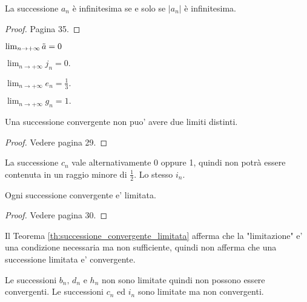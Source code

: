 \begin{proposition}
    La successione $a_n$ è infinitesima se e solo se $|a_n|$ è infinitesima.
\end{proposition}
\begin{proof}
    Pagina 35.
\end{proof}

\begin{example}       $\lim_{n\rightarrow+\infty}\Tilde{a} = 0$
\end{example}

\begin{example}
    $\lim_{n\rightarrow+\infty}j_n = 0.$
\end{example}

\begin{example}
    $\lim_{n\rightarrow+\infty}e_n = \frac{1}{3}.$
\end{example}

\begin{example}
    $\lim_{n\rightarrow+\infty}g_n = 1.$
\end{example}

\begin{theorem}
    Una successione convergente non puo' avere due limiti distinti.
\end{theorem}
\begin{proof}
    Vedere pagina 29.
\end{proof}

\begin{example}
    La successione $c_n$ vale alternativamente 0 oppure 1, quindi non potrà essere contenuta in un raggio minore di $\frac{1}{2}$. Lo stesso $i_n$.
\end{example}

\begin{theorem}\label{th:successione_convergente_limitata}
    Ogni successione convergente e' limitata.
\end{theorem}
\begin{proof}
    Vedere pagina 30.
\end{proof}

\begin{remark}
    Il Teorema \ref{th:successione_convergente_limitata} afferma che la "limitazione" e' una condizione necessaria ma non sufficiente, quindi non afferma che una successione limitata e' convergente.
\end{remark}

\begin{example}
    Le successioni $b_n,\, d_n$ e $h_n$ non sono limitate quindi non possono essere convergenti. Le successioni $c_n$ ed $i_n$ sono limitate ma non convergenti.
\end{example}


